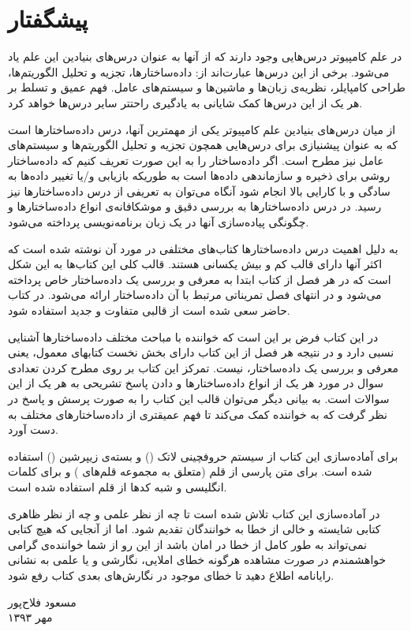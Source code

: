 \section*{پیشگفتار}
\thispagestyle{empty}
در علم کامپیوتر درس‌هایی وجود دارند که از آنها به عنوان درس‌های بنیادین این علم یاد می‌شود. برخی از این درس‌ها عبارت‌اند از: داده‌ساختارها، تجزیه و تحلیل الگوریتم‌ها، طراحی کامپایلر، نظریه‌ی زبان‌ها و ماشین‌ها و سیستم‌های عامل. فهم عمیق و تسلط بر هر یک از این درس‌ها کمک شایانی به یادگیری راحتتر سایر درس‌ها خواهد کرد.

از میان درس‌های بنیادین علم کامپیوتر یکی از مهمترین آنها، درس داده‌ساختارها است که به عنوان پیشنیازی برای درس‌هایی همچون تجزیه و تحلیل الگوریتم‌ها و سیستم‌های عامل نیز مطرح است. اگر داده‌ساختار را به این صورت تعریف کنیم که {\prq}داده‌ساختار روشی برای ذخیره و سازماندهی داده‌ها است به طوریکه بازیابی و/یا تغییر داده‌ها به سادگی و با کارایی بالا انجام شود{\plq} آنگاه می‌توان به تعریفی از درس داده‌ساختارها نیز رسید. در درس داده‌ساختارها به بررسی دقیق و موشکافانه‌ی انواع داده‌ساختارها و چگونگی پیاده‌سازی آنها در یک زبان برنامه‌نویسی پرداخته می‌شود.

به دلیل اهمیت درس داده‌ساختارها کتاب‌های مختلفی در مورد آن نوشته شده است که اکثر آنها دارای قالب کم و بیش یکسانی هستند. قالب کلی این کتاب‌ها به این شکل است که در هر فصل از کتاب ابتدا به معرفی و بررسی یک داده‌ساختار خاص پرداخته می‌شود و در انتهای فصل تمریناتی مرتبط با آن داده‌ساختار ارائه می‌شود. در کتاب حاضر سعی شده است از قالبی متفاوت و جدید استفاده شود.

در این کتاب فرض بر این است که خواننده با مباحث مختلف داده‌ساختارها آشنایی نسبی دارد و در نتیجه هر فصل از این کتاب دارای بخش نخست کتابهای معمول، یعنی معرفی و بررسی یک داده‌ساختار، نیست. تمرکز این کتاب بر روی مطرح کردن تعدادی سوال در مورد هر یک از انواع داده‌ساختارها و دادن پاسخ تشریحی به هر یک از این سوالات است. به بیانی دیگر می‌توان قالب این کتاب را به صورت پرسش و پاسخ در نظر گرفت که به خواننده کمک می‌کند تا فهم عمیقتری از داده‌ساختارهای مختلف به دست آورد.

برای آماده‌سازی این کتاب از سیستم حروفچینی لاتک ({\lr{\LaTeX}}) و بسته‌ی زیپرشین ({\lr{\XePersian}}) استفاده شده است. برای متن پارسی از قلم {} (متعلق به مجموعه قلم‌های {}) و برای کلمات انگلیسی و شبه کدها از قلم {} استفاده شده است.

در آماده‌سازی این کتاب تلاش شده است تا چه از نظر علمی و چه از نظر ظاهری کتابی شایسته و خالی از خطا به خوانندگان تقدیم شود. اما از آنجایی که هیچ کتابی نمی‌تواند به طور کامل از خطا در امان باشد از این رو از شما خواننده‌ی گرامی خواهشمندم در صورت مشاهده هرگونه خطای املایی، نگارشی و یا علمی به نشانی رایانامه {} اطلاع دهید تا خطای موجود در نگارش‌های بعدی کتاب رفع شود.

\begin{flushleft}
\small
مسعود فلاح‌پور\\
مهر ۱۳۹۳
\end{flushleft}